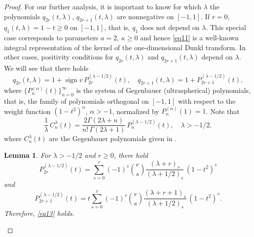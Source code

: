 \documentclass[12pt,twoside,reqno]{amsart}\usepackage[cp1251]{inputenc}
\theoremstyle{plain}
\newtheorem{lemma}[theorem]{Lemma}
\theoremstyle{remark}
\newcommand\sign{\operatorname{sign}}
\begin{document}
\begin{proof}
 For our further analysis, it is important to know for which $\lambda$ the polynomials  $q_{2r}(t,\lambda)$, $q_{2r+1}(t,\lambda)$ are nonnegative on $[-1,1]$. If  $r=0$,
  $q_{1}(t,\lambda)=1-t\ge 0$ %
 on $[-1,1]$, that is,
 $q_{1}$ does not depend on $\lambda$. This special case corresponds to parameters $a=2,\, \kappa\ge 0$
and hence \eqref{eq11} is a well-known integral representation of the kernel of the one-dimensional Dunkl transform.
  In other cases, positivity conditions
 for $q_{2r}(t,\lambda)$ and $q_{2r+1}(t,\lambda)$ depend on  $\lambda$.
 We will see that there holds
 \begin{equation}\label{eq13}
q_{2r}(t,\lambda)=1+\sign v\,P_{2r}^{(\lambda-1/2)}(t),\quad q_{2r+1}(t,\lambda)=1+P_{2r+1}^{(\lambda-1/2)}(t),
\end{equation}
where
  $\{P_n^{(\alpha)}(t)\}_{n=0}^{\infty}$ is the system of Gegenbauer (ultraspherical) polynomials, that is, the family of polynomials orthogonal on $[-1,1]$  with respect to the weight function $(1-t^2)^{\alpha}$, $\alpha>-1$, normalized by $P_n^{(\alpha)}(1)=1$. Note that
\begin{equation}\label{eq12}
\frac{1}{\lambda}\,C_n^{\lambda}(t)=\frac{2\Gamma(2\lambda+n)}{n!\,\Gamma(2\lambda+1)}\,P_n^{(\lambda-1/2)}(t),\quad
\lambda>-1/2,
\end{equation}
where
$C_n^{\lambda}(t)$ are the Gegenbauer polynomials given in \cite[Chapt. X,10.9]{BE53a}.


\begin{lemma}\label{lem5}
For  $\lambda>-1/2$ and $r\ge 0$, there hold
\begin{equation*}%
P_{2r}^{(\lambda-1/2)}(t)=\sum_{s=0}^{r}(-1)^{s}
\binom{r}{s}\frac{(\lambda+r)_{s}}{(\lambda+1/2)_{s}}\,(1-t^2)^s
\end{equation*}
and
\begin{equation*}%
P_{2r+1}^{(\lambda-1/2)}(t)=t\sum_{s=0}^{r}(-1)^{s}
\binom{r}{s}\frac{(\lambda+r+1)_{s}}{(\lambda+1/2)_{s}}\,(1-t^2)^s.
\end{equation*}
Therefore, \eqref{eq13} holds.
\end{lemma}


\end{proof}
\end{document}
